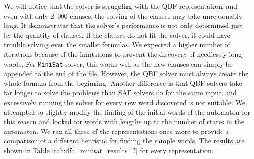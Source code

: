 We will notice that the solver is struggling with the QBF representation, and even with only 2\ 000 clauses, the solving of the clauses may take unreasonably long. It demonstrates that the solver's performance is not only determined just by the quantity of clauses. If the clauses do not fit the solver, it could have trouble solving even the smaller formulas. We expected a higher number of iterations because of the limitations to prevent the discovery of needlessly long words. For \texttt{MiniSat} solver, this works well as the new clauses can simply be appended to the end of the file. However, the QBF solver must always create the whole formula from the beginning. Another difference is that QBF solvers take far longer to solve the problems than SAT solvers do for the same input, and excessively running the solver for every new word discovered is not suitable. We attempted to slightly modify the finding of the initial words of the automaton for this reason and looked for words with lengths up to the number of states in the automaton. We ran all three of the representations once more to provide a comparison of a different heuristic for finding the sample words. The results are shown in Table \ref{tab:dfa_minisat_results_2} for every representation. 

